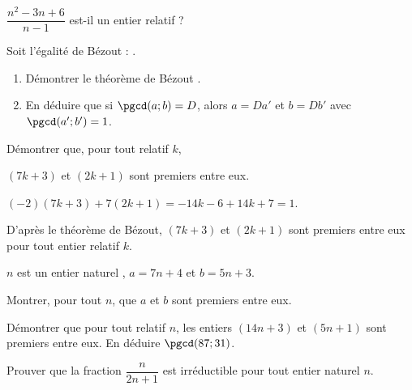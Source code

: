 \begin{colonne*exercice}
\begin{exercice}
\begin{enumerate}
$\dfrac{n^2-3n+6}{n-1}$ est-il un entier relatif ?
\end{enumerate}
\end{exercice}



\begin{exercice}
Soit l’égalité de Bézout : .
\begin{enumerate}
\item Démontrer le théorème de Bézout .
\item En déduire que si $\pgcd(a;b) = D$, alors $a = Da'$ et $b = Db'$ avec $\pgcd(a'; b') = 1$.
\end{enumerate}
\end{exercice}

\columnbreak

\begin{exercice*}
\label{exo-bezout}
Démontrer que, pour tout relatif $k$,

$(7k+3)$ et $(2k+1)$ sont premiers entre eux.
\end{exercice*}
\begin{corrige}
  $(-2)(7k+3)+7(2k+1)=-14k-6+14k+7=1$.

  D'après le théorème de Bézout, $(7k+3)$ et $(2k+1)$ sont premiers
  entre eux pour tout entier relatif $k$.
\end{corrige}

\begin{exercice}
$n$ est un entier naturel , $a=7n+4$ et $b=5n+3$.

Montrer, pour tout $n$, que $a$ et $b$ sont premiers entre eux.
\end{exercice}

\begin{exercice}
Démontrer que pour tout relatif $n$, les entiers $(14n+3)$ et $(5n+1)$ sont premiers entre eux. En déduire $\pgcd(87;31)$.
\end{exercice}

\begin{exercice}
Prouver que la fraction $\dfrac{n}{2n+1}$ est irréductible pour tout entier naturel $n$.
\end{exercice}


\end{colonne*exercice}
